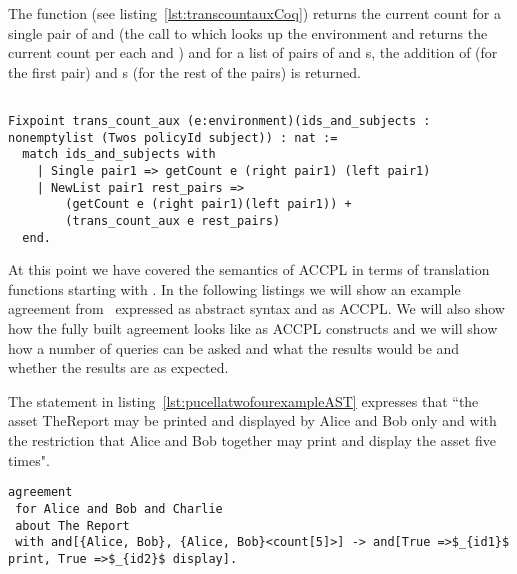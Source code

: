The function  (see listing~\ref{lst:transcountauxCoq}) returns the current count for a single pair of  and  (the call to  which looks up the environment  and returns the current count per each  and ) and for a list of pairs of  and s, the addition of  (for the first pair) and s (for the rest of the pairs) is returned. 

\begin{minipage}[c]{0.95\textwidth}
\begin{lstlisting}

Fixpoint trans_count_aux (e:environment)(ids_and_subjects : nonemptylist (Twos policyId subject)) : nat :=
  match ids_and_subjects with
	| Single pair1 => getCount e (right pair1) (left pair1)
	| NewList pair1 rest_pairs =>
	    (getCount e (right pair1)(left pair1)) +
	    (trans_count_aux e rest_pairs)
  end.
\end{lstlisting}
\end{minipage}


At this point we have covered the semantics of \ac{ACCPL} in terms of translation functions starting with . In the following listings we will show an example agreement from~\cite{pucella2006} expressed as abstract syntax and as \ac{ACCPL}. We will also show how the fully built agreement looks like as \ac{ACCPL} constructs and we will show how a number of queries can be asked and what the results would be and whether the results are as expected.

The statement in listing~\ref{lst:pucellatwofourexampleAST} expresses that ``the asset TheReport may be printed and displayed by Alice and Bob only and with the restriction that Alice and Bob together may print and display the asset five times".

\lstset{language=Pucella2006}
\begin{minipage}[c]{0.95\textwidth}
\begin{lstlisting}[frame=single, caption={Agreement of Example 2.4}, label={lst:pucellatwofourexampleAST}, mathescape]
agreement
 for Alice and Bob and Charlie
 about The Report 
 with and[{Alice, Bob}, {Alice, Bob}<count[5]>] -> and[True =>$_{id1}$ print, True =>$_{id2}$ display].
\end{lstlisting}
\end{minipage} 

